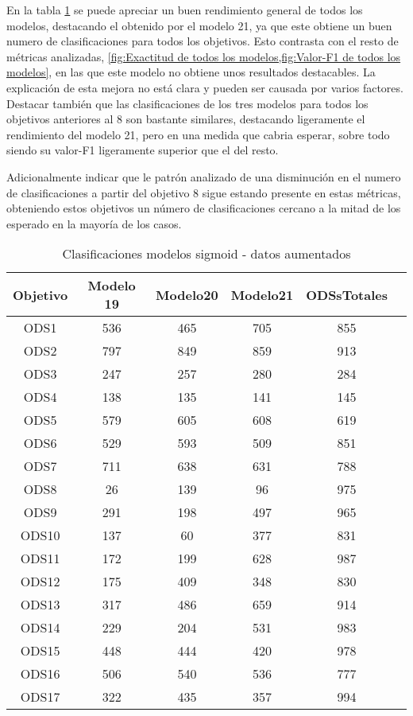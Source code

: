 En la tabla \cref{table:Clasificaciones modelos sigmoid - datos aumentados} se
puede apreciar un buen rendimiento general de todos los modelos, destacando el
obtenido por el modelo 21, ya que este obtiene un buen numero de clasificaciones
para todos los objetivos. Esto contrasta con el resto de métricas analizadas,
\cref{fig:Exactitud de todos los modelos,fig:Valor-F1 de todos los modelos}, en
las que este modelo no obtiene unos resultados destacables. La explicación de esta
mejora no está clara y pueden ser causada por varios factores. Destacar también
que las clasificaciones de los tres modelos para todos los objetivos anteriores
al 8 son bastante similares, destacando ligeramente el rendimiento del modelo
21, pero en una medida que cabria esperar, sobre todo siendo su valor-F1
ligeramente superior que el del resto.  

Adicionalmente indicar que le patrón analizado de una disminución en el numero
de clasificaciones a partir del objetivo 8 sigue estando presente en estas
métricas, obteniendo estos objetivos un número de clasificaciones cercano a la
mitad de los esperado en la mayoría de los casos. 

\begin{table}[H]
    \begin{tabular}{| c || c | c  | c  | c  | c |}
        \hline
        Objetivo & Modelo 19 & Modelo20 & Modelo21 & ODSsTotales\\
        \hline \hline
        ODS1   & 536 & 465 & 705 & 855\\ \hline
        ODS2   & 797 & 849 & 859 & 913\\ \hline
        ODS3   & 247 & 257 & 280 & 284\\ \hline
        ODS4   & 138 & 135 & 141 & 145\\ \hline
        ODS5   & 579 & 605 & 608 & 619\\ \hline
        ODS6   & 529 & 593 & 509 & 851\\ \hline
        ODS7   & 711 & 638 & 631 & 788\\ \hline
        ODS8   & 26  & 139 & 96  & 975\\ \hline
        ODS9   & 291 & 198 & 497 & 965\\ \hline
        ODS10  & 137 & 60  & 377 & 831\\ \hline
        ODS11  & 172 & 199 & 628 & 987\\ \hline
        ODS12  & 175 & 409 & 348 & 830\\ \hline
        ODS13  & 317 & 486 & 659 & 914\\ \hline
        ODS14  & 229 & 204 & 531 & 983\\ \hline
        ODS15  & 448 & 444 & 420 & 978\\ \hline
        ODS16  & 506 & 540 & 536 & 777\\ \hline
        ODS17  & 322 & 435 & 357 & 994\\ \hline
    \end{tabular}
    \caption{Clasificaciones modelos sigmoid - datos aumentados}
    \label{table:Clasificaciones modelos sigmoid - datos aumentados}
\end{table}


